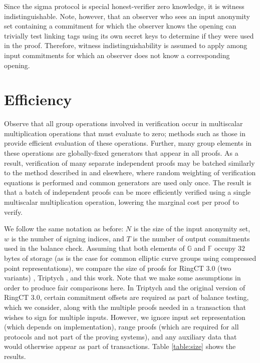 \documentclass{article}
\newcommand{\G}{\mathbb{G}}
\newcommand{\F}{\mathbb{F}}
\theoremstyle{definition}
\begin{document}
Since the sigma protocol is special honest-verifier zero knowledge, it is witness indistinguishable.
Note, however, that an observer who sees an input anonymity set containing a commitment for which the observer knows the opening can trivially test linking tags using its own secret keys to determine if they were used in the proof.
Therefore, witness indistinguishability is assumed to apply among input commitments for which an observer does not know a corresponding opening.


\section{Efficiency}
Observe that all group operations involved in verification occur in multiscalar multiplication operations that must evaluate to zero; methods such as those in \cite{straus,pippenger} provide efficient evaluation of these operations.
Further, many group elements in these operations are globally-fixed generators that appear in all proofs.
As a result, verification of many separate independent proofs may be batched similarly to the method described in \cite{bulletproofs} and elsewhere, where random weighting of verification equations is performed and common generators are used only once.
The result is that a batch of independent proofs can be more efficiently verified using a single multiscalar multiplication operation, lowering the marginal cost per proof to verify.

We follow the same notation as before: $N$ is the size of the input anonymity set, $w$ is the number of signing indices, and $T$ is the number of output commitments used in the balance check.
Assuming that both elements of $\G$ and $\F$ occupy $32$ bytes of storage (as is the case for common elliptic curve groups using compressed point representations), we compare the size of proofs for RingCT 3.0 (two variants) \cite{rct3}, Triptych \cite{triptych}, and this work.
Note that we make some assumptions in order to produce fair comparisons here.
In Triptych and the original version of RingCT 3.0, certain commitment offsets are required as part of balance testing, which we consider, along with the multiple proofs needed in a transaction that wishes to sign for multiple inputs.
However, we ignore input set representation (which depends on implementation), range proofs (which are required for all protocols and not part of the proving systems), and any auxiliary data that would otherwise appear as part of transactions.
Table \ref{table:size} shows the results.
\end{document}
